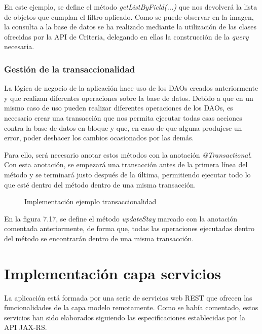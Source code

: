 En este ejemplo, se define el método \textit{getListByField(...)} que nos devolverá la lista de objetos que cumplan el filtro aplicado. Como se puede observar en la imagen, la consulta a la base de datos se ha realizado mediante la utilización de las clases ofrecidas por la API de Criteria, delegando en ellas la construcción de la \textit{query} necesaria.


\subsubsection*{Gestión de la transaccionalidad}
La lógica de negocio de la aplicación hace uso de los DAOs creados anteriormente y que realizan diferentes operaciones sobre la base de datos. Debido a que en un mismo caso de uso pueden realizar diferentes operaciones de los DAOs, es necesario crear una transacción que nos permita ejecutar todas esas acciones contra la base de datos en bloque y que, en caso de que alguna produjese un error, poder deshacer los cambios ocasionados por las demás.

Para ello, será necesario anotar estos métodos con la anotación \textit{@Transactional}. Con esta anotación, se empezará una transacción antes de la primera línea del método y se terminará justo después de la última, permitiendo ejecutar todo lo que esté dentro del método dentro de una misma transacción.

\begin{figure}[H]
\centering
{}
\caption{Implementación ejemplo transaccionalidad}
\end{figure}

En la figura 7.17, se define el método \textit{updateStay} marcado con la anotación comentada anteriormente, de forma que, todas las operaciones ejecutadas dentro del método se encontrarán dentro de una misma transacción. 


\section{Implementación capa servicios}
La aplicación está formada por una serie de servicios web REST que ofrecen las funcionalidades de la capa modelo remotamente. Como se había comentado, estos servicios han sido elaborados siguiendo las especificaciones establecidas por la API JAX-RS.


